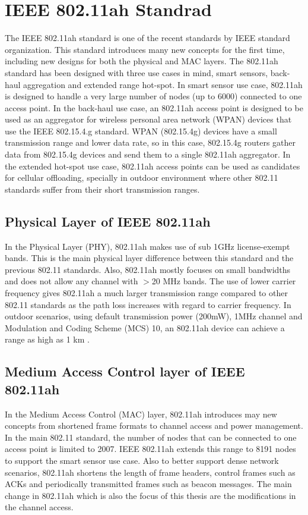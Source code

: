 \label{chapter:background}

\section{IEEE 802.11ah Standrad}

 The IEEE 802.11ah standard is one of the recent standards by IEEE standard organization. This standard introduces many new concepts for the first time, including new designs for both the physical and MAC layers. The 802.11ah standard has been designed with three use cases in mind, smart sensors, back-haul aggregation and extended range hot-spot. In smart sensor use case, 802.11ah is designed to handle a very large number of nodes (up to 6000) connected to one access point. In the back-haul use case, an 802.11ah access point is designed to be used as an aggregator for wireless personal area network (WPAN) devices that use the IEEE 802.15.4.g standard. WPAN (802.15.4g) devices have a small transmission range and lower data rate, so in this case, 802.15.4g routers gather data from 802.15.4g devices and send them to a single 802.11ah aggregator. In the extended hot-spot use case, 802.11ah access points can be used as candidates for cellular offloading, specially in outdoor environment where other 802.11 standards suffer from their short transmission ranges.

\subsection{Physical Layer of IEEE 802.11ah}
In the Physical Layer (PHY), 802.11ah makes use of sub 1GHz license-exempt bands. This is the main physical layer difference between this standard and the previous 802.11 standards. Also, 802.11ah mostly focuses on small bandwidths and does not allow any channel with $>$20 MHz bands. The use of lower carrier frequency gives 802.11ah a much larger transmission range compared to other 802.11 standards as the path loss increases with regard to carrier frequency. In outdoor scenarios, using default transmission power (200mW), 1MHz channel and Modulation and Coding Scheme (MCS) 10, an 802.11ah device can achieve a range as high as 1 km \cite{khorov2015survey}. 

\subsection{Medium Access Control layer of IEEE 802.11ah}
 In the Medium Access Control (MAC) layer, 802.11ah introduces may new concepts from shortened frame formats to channel access and power management. In the main 802.11 standard, the number of nodes that can be connected to one access point is limited to 2007. IEEE 802.11ah extends this range to 8191 nodes to support the smart sensor use case. Also to better support dense network scenarios, 802.11ah shortens the length of frame headers, control frames such as ACKs and periodically transmitted frames such as beacon messages. The main change in 802.11ah which is also the focus of this thesis are the modifications in the channel access. 

